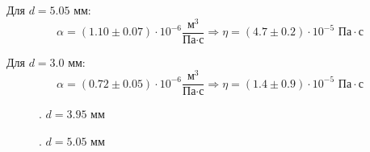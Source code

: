 \documentclass[a4paper]{article}
\begin{document}
\begin{itemize}
\noindent
Для $d = 5.05$ мм:
\[\alpha =  (1.10 \pm 0.07) \cdot 10^{-6} \frac{\text{м}^3}{\text{Па} \cdot \text{с}} \Rightarrow \eta = (4.7 \pm 0.2) \cdot 10^{-5} \text{ Па} \cdot \text{с}\]

\noindent
Для $d = 3.0$ мм:
\[\alpha =  (0.72 \pm 0.05) \cdot 10^{-6} \frac{\text{м}^3}{\text{Па} \cdot \text{с}} \Rightarrow \eta = (1.4 \pm 0.9) \cdot 10^{-5} \text{ Па} \cdot \text{с}\]


\begin{figure}
\caption{. $d = 3.95$ мм}
\end{figure}

\begin{figure}
\caption{. $d = 5.05$ мм}
\end{figure}


\end{itemize}
\end{document}
